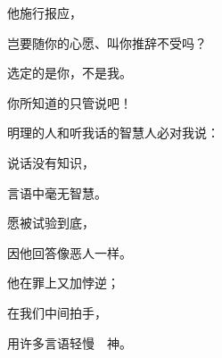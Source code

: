 {\par }{\Q {}他施行报应，
\par }{\Q 岂要随你的心愿、叫你推辞不受吗？
\par }{\Q 选定的是你，不是我。
\par }{\Q 你所知道的只管说吧！
\par }{\Q {}明理的人和听我话的智慧人必对我说：
\par }{\Q {}说话没有知识，
\par }{\Q 言语中毫无智慧。
\par }{\Q {}愿{}被试验到底，
\par }{\Q 因他回答像恶人一样。
\par }{\Q {}他在罪上又加悖逆；
\par }{\Q 在我们中间拍手，
\par }{\Q 用许多言语轻慢　神。

}
